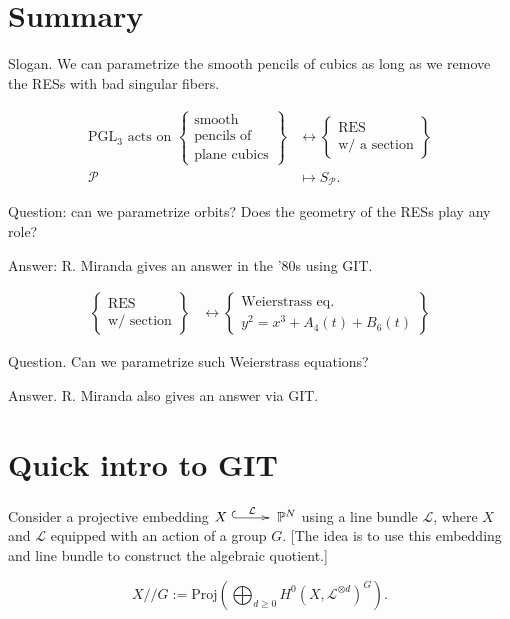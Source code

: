 \section{Summary}
\label{section-summary}

\noindent
Slogan. We can parametrize the smooth pencils
of cubics as long
as we remove the RESs with bad singular
fibers.

$$
\begin{aligned}
\text{PGL}_3\text{ acts on }
\left\{
\substack{
\text{smooth} \\
\text{pencils of}\\
\text{plane cubics}}\right\}
&\leftrightarrow
\left\{\substack{
\text{RES} \\ \text{
w/ a section}}\right\}\\
\mathcal{P}
&  \mapsto
S_{\mathcal{P}}.
\end{aligned}
$$

\noindent
Question: can we parametrize orbits?
Does the geometry of the RESs
play any role?

\noindent
Answer: R. Miranda gives an answer
in the '80s using GIT.

$$
\begin{aligned}
\left\{
\substack{\text{RES } \\ \text{w/
section}}\right\}&\leftrightarrow
\left\{\substack{\text{Weierstrass eq.} \\
y^2=x^3+A_4(t)+B_6(t)}\right\}
\end{aligned}
$$

\noindent
Question. Can we parametrize such Weierstrass
equations?

\noindent
Answer. R. Miranda also gives an answer via
GIT.

\section{Quick intro to GIT}
\label{section-git}

Consider a projective embedding
$X
\xymatrix{\ar@{^{(}->}[r]^{\mathcal{L}}&}
\mathbb{P}^N$
using a line bundle $\mathcal{L}$,
where $X$ and $\mathcal{L}$ equipped with an
action of a group $G$.
[The idea is to use this embedding and line
bundle
to construct the algebraic quotient.]

\begin{definition}
\label{definition-git}
$$
X//G:=
\text{Proj}
\left(
\bigoplus_{d \geq 0}
H^0(X,\mathcal{L}^{\otimes d})^G\right).
$$
\end{definition}

